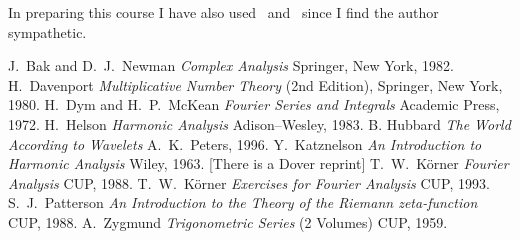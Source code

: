 In preparing this course I have also used~\cite{Korner1}
and~\cite{Korner2} since I find the author sympathetic.
\begin{thebibliography}{99}
 J.~Bak and D.~J.~Newman
\emph{Complex Analysis}
Springer, New York, 1982.
 H.~Davenport
\emph{Multiplicative Number Theory}
(2nd Edition), Springer, New York, 1980.
 H.~Dym and H.~P.~McKean
\emph{Fourier Series and Integrals}
Academic Press, 1972.
 H.~Helson
\emph{Harmonic Analysis}
Adison--Wesley, 1983.
 B. Hubbard
\emph{The World According to Wavelets}
A.~K.~Peters, 1996.
 Y.~Katznelson
\emph{An Introduction to Harmonic Analysis}
Wiley, 1963. [There is a Dover reprint]
 T.~W.~K\"{o}rner
\emph{Fourier Analysis}
CUP, 1988.
 T.~W.~K\"{o}rner
\emph{Exercises for Fourier Analysis}
CUP, 1993.
 S.~J.~Patterson
\emph{An Introduction to the Theory of the Riemann zeta-function}
CUP, 1988.
 A.~Zygmund
\emph{Trigonometric Series} (2 Volumes)
CUP, 1959.
\end{thebibliography}

